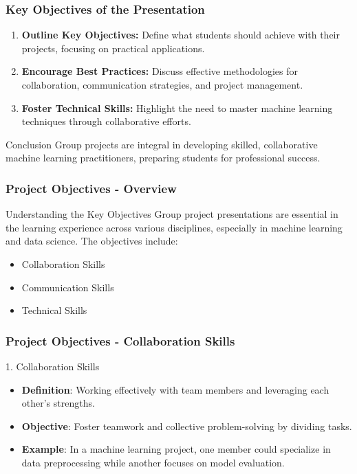 \documentclass[aspectratio=169]{beamer}
\begin{document}
\begin{frame}[fragile]
    \frametitle{Key Objectives of the Presentation}
    \begin{enumerate}
        \item \textbf{Outline Key Objectives:} Define what students should achieve with their projects, focusing on practical applications.
        \item \textbf{Encourage Best Practices:} Discuss effective methodologies for collaboration, communication strategies, and project management.
        \item \textbf{Foster Technical Skills:} Highlight the need to master machine learning techniques through collaborative efforts.
    \end{enumerate}
    
    \begin{block}{Conclusion}
        Group projects are integral in developing skilled, collaborative machine learning practitioners, preparing students for professional success.
    \end{block}
\end{frame}

\begin{frame}[fragile]
    \frametitle{Project Objectives - Overview}
    \begin{block}{Understanding the Key Objectives}
        Group project presentations are essential in the learning experience across various disciplines, especially in machine learning and data science. 
        The objectives include:
        \begin{itemize}
            \item Collaboration Skills
            \item Communication Skills
            \item Technical Skills
        \end{itemize}
    \end{block}
\end{frame}

\begin{frame}[fragile]
    \frametitle{Project Objectives - Collaboration Skills}
    \begin{block}{1. Collaboration Skills}
        \begin{itemize}
            \item \textbf{Definition}: Working effectively with team members and leveraging each other's strengths.
            \item \textbf{Objective}: Foster teamwork and collective problem-solving by dividing tasks.
            \item \textbf{Example}: In a machine learning project, one member could specialize in data preprocessing while another focuses on model evaluation.
        \end{itemize}
    \end{block}
\end{frame}
\end{document}
